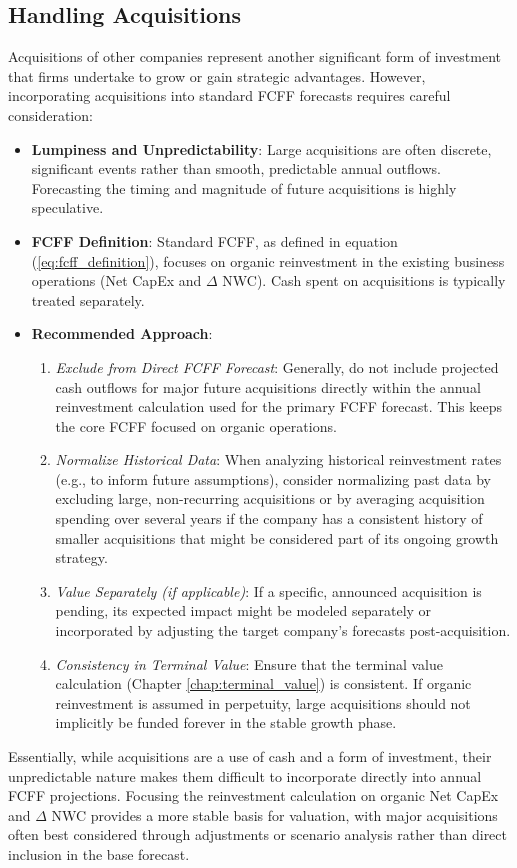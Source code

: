 \subsection{Handling Acquisitions} \label{sec:acquisitions_treatment}
Acquisitions of other companies represent another significant form of investment that firms undertake to grow or gain strategic advantages. However, incorporating acquisitions into standard FCFF forecasts requires careful consideration:
\begin{itemize}
    \item \textbf{Lumpiness and Unpredictability}: Large acquisitions are often discrete, significant events rather than smooth, predictable annual outflows. Forecasting the timing and magnitude of future acquisitions is highly speculative.
    \item \textbf{FCFF Definition}: Standard FCFF, as defined in equation (\ref{eq:fcff_definition}), focuses on organic reinvestment in the existing business operations (Net CapEx and \(\Delta\) NWC). Cash spent on acquisitions is typically treated separately.
    \item \textbf{Recommended Approach}:
          \begin{enumerate}
              \item \textit{Exclude from Direct FCFF Forecast}: Generally, do not include projected cash outflows for major future acquisitions directly within the annual reinvestment calculation used for the primary FCFF forecast. This keeps the core FCFF focused on organic operations.
              \item \textit{Normalize Historical Data}: When analyzing historical reinvestment rates (e.g., to inform future assumptions), consider normalizing past data by excluding large, non-recurring acquisitions or by averaging acquisition spending over several years if the company has a consistent history of smaller acquisitions that might be considered part of its ongoing growth strategy.
              \item \textit{Value Separately (if applicable)}: If a specific, announced acquisition is pending, its expected impact might be modeled separately or incorporated by adjusting the target company's forecasts post-acquisition.
              \item \textit{Consistency in Terminal Value}: Ensure that the terminal value calculation (Chapter \ref{chap:terminal_value}) is consistent. If organic reinvestment is assumed in perpetuity, large acquisitions should not implicitly be funded forever in the stable growth phase.
          \end{enumerate}
\end{itemize}
Essentially, while acquisitions are a use of cash and a form of investment, their unpredictable nature makes them difficult to incorporate directly into annual FCFF projections. Focusing the reinvestment calculation on organic Net CapEx and \(\Delta\) NWC provides a more stable basis for valuation, with major acquisitions often best considered through adjustments or scenario analysis rather than direct inclusion in the base forecast.

